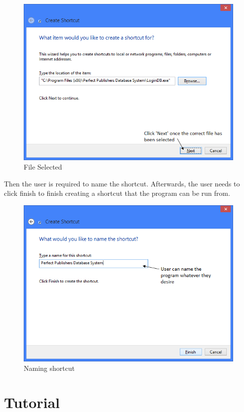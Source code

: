 \begin{figure}[H]
    \includegraphics[width=\textwidth]{./Manual/Installation/FileSelected.png}
    \caption{File Selected} \label{fig:FileSelected}
\end{figure}


Then the user is required to name the shortcut. Afterwards, the user needs to click finish to finish creating a shortcut that the program can be run from.

\begin{figure}[H]
    \includegraphics[width=\textwidth]{./Manual/Installation/NameShortcut.png}
    \caption{Naming shortcut}
\end{figure}

\section{Tutorial}

